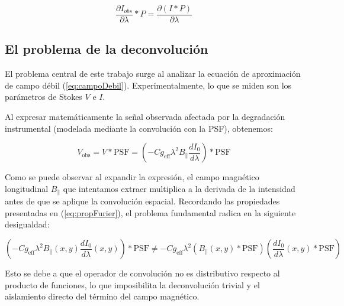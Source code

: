\begin{equation}
    \label{eq:propDeriConvol}
    \frac{\partial I_{obs}}{\partial \lambda} * P = \frac{\partial(I * P)}{\partial \lambda}
\end{equation}

\subsection{El problema de la deconvolución}
El problema central de este trabajo surge al analizar la ecuación de aproximación de campo débil (\ref{eq:campoDebil}). Experimentalmente, lo que se miden son los parámetros de Stokes $V$ e $I$. 

Al expresar matemáticamente la señal observada afectada por la degradación instrumental (modelada mediante la convolución con la PSF), obtenemos:

\begin{equation}
    \label{eq:expresionConvolucionada}
    V_{\mathrm{obs}} = V \ast \mathrm{PSF} = \left(-C g_{\mathrm{eff}} \lambda^2 B_{\parallel} \frac{d I_0}{d \lambda} \right) \ast \mathrm{PSF}
\end{equation}

Como se puede observar al expandir la expresión, el campo magnético longitudinal $B_{\parallel}$ que intentamos extraer multiplica a la derivada de la intensidad antes de que se aplique la convolución espacial. Recordando las propiedades presentadas en (\ref{eq:propFurier}), el problema fundamental radica en la siguiente desigualdad:

\begin{equation}
    \label{eq:imposibilidadDecon}
    \left(-C g_{\mathrm{eff}} \lambda^2 B_{\parallel}(x, y) \frac{d I_0}{d \lambda}(x, y) \right) \ast \mathrm{PSF} \neq -C g_{\mathrm{eff}} \lambda^2 \left(B_{\parallel}(x, y) \ast \mathrm{PSF} \right) \left(\frac{d I_0}{d \lambda}(x, y) \ast \mathrm{PSF} \right)
\end{equation}

Esto se debe a que el operador de convolución no es distributivo respecto al producto de funciones, lo que imposibilita la deconvolución trivial y el aislamiento directo del término del campo magnético. 


